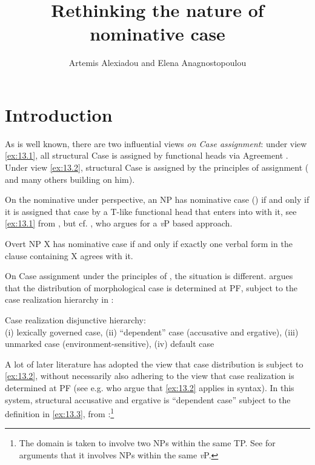 \documentclass[output=paper]{langsci/langscibook}
\author{Artemis Alexiadou\affiliation{Humboldt-Universität zu
    Berlin \& Leibniz-Zentrum Allgemeine Sprachwissenschaft} and Elena
Anagnostopoulou\affiliation{University of Crete}}
\title{Rethinking the nature of nominative case}
\begin{document}
\glsresetall
\maketitle

\section{Introduction}

As is well known, there are two influential views \emph{on Case assignment}:
under view \eqref{ex:13.1}, all structural Case is assigned by functional
heads via Agreement \citep{Chomsky2001}. Under view \eqref{ex:13.2},
structural Case is assigned by the principles of 
assignment (\citealt{Marantz1991} and many others building on him).

On the nominative under  perspective, an NP has nominative case (\Nom) if
and only if it is assigned that case by a T-like functional head that enters
into  with it, see \eqref{ex:13.1} from \citet{Baker2015}, but cf.
\textcite{Sigurdsson2000}, who argues for a \emph{v}P based approach.

\ea\label{ex:13.1} Overt NP X has nominative case if and only if exactly
    one verbal form in the clause containing X agrees with it.
\z

On Case assignment under the principles of , the situation is
different. \citet{Marantz1991} argues that the distribution of morphological
case is determined at PF, subject to the case realization hierarchy in
:

\ea%
    \label{ex:13.2} Case realization disjunctive hierarchy:\\
    (i) lexically governed case, (ii) \enquote{dependent} case (accusative and
    ergative), (iii) unmarked case (environment-sensitive), (iv) default case
\z

A lot of later literature has adopted the view that case distribution is
subject to \eqref{ex:13.2}, without necessarily also adhering to the view
that case realization is determined at PF (see e.g.
\citealt{Preminger2014,Baker2015} who argue that \eqref{ex:13.2} applies in
syntax). In this system, structural accusative and ergative is “dependent case”
subject to the definition in \eqref{ex:13.3}, from
\citet[74]{Baker2015}:\footnote{The domain is taken to involve two NPs within
    the same TP. See \citet{Schafer2012} for arguments that it involves NPs
within the same \emph{v}P.}
\end{document}
